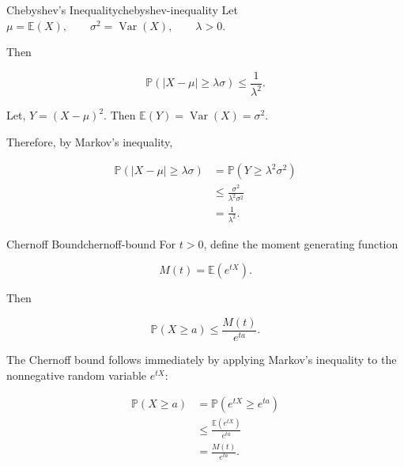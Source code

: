 
\begin{definition}{Chebyshev's Inequality}{chebyshev-inequality}
Let
\(
    \mu=\mathbb{E}(X),
    \qquad
    \sigma^2=\operatorname{Var}(X),
    \qquad
    \lambda>0.
\)

Then

\[
    \mathbb{P}
    \left(
        |X-\mu|\geq\lambda\sigma
    \right)
    \leq
    \frac{1}{\lambda^2}.
\]
\end{definition}

\begin{remark}
Let, 
\(
    Y=(X-\mu)^2.
\)
Then
\(
    \mathbb{E}(Y)
    =
    \operatorname{Var}(X)
    =
    \sigma^2.
\)

Therefore, by Markov's inequality,

\[
\begin{aligned}
    \mathbb{P}
    \left(
        |X-\mu|\geq\lambda\sigma
    \right)
    &=
    \mathbb{P}
    \left(
        Y\geq\lambda^2\sigma^2
    \right) \\
    &\leq
    \frac{\sigma^2}
    {\lambda^2\sigma^2} \\
    &=
    \frac{1}{\lambda^2}.
\end{aligned}
\]
\end{remark}


\begin{definition}{Chernoff Bound}{chernoff-bound}
For $t>0$, define the moment generating function

\[
    M(t)=\mathbb{E}(e^{tX}).
\]

Then

\[
    \mathbb{P}(X\geq a)
    \leq
    \frac{M(t)}{e^{ta}}.
\]
\end{definition}

\begin{remark}
The Chernoff bound follows immediately by applying Markov's
inequality to the nonnegative random variable $e^{tX}$:

\[
\begin{aligned}
    \mathbb{P}(X\geq a)
    &=
    \mathbb{P}(e^{tX}\geq e^{ta}) \\
    &\leq
    \frac{\mathbb{E}(e^{tX})}{e^{ta}} \\
    &=
    \frac{M(t)}{e^{ta}}.
\end{aligned}
\]
\end{remark}

